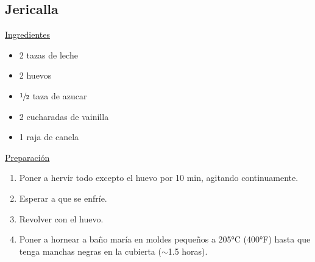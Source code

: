 \subsection{Jericalla}
\underline{Ingredientes}
\begin{itemize}
\item 2 tazas de leche
\item 2 huevos 
\item $\sfrac{1}{2}$ taza de azucar
\item 2 cucharadas de vainilla
\item 1 raja de canela
\end{itemize}

\underline{Preparaci\'on}
\begin{enumerate}
\item Poner a hervir todo excepto el huevo por 10 min, agitando continuamente.
\item Esperar a que se enfr\'ie.
\item Revolver con el huevo.
\item Poner a hornear a ba\~no mar\'ia en moldes peque\~nos a 205°C (400°F) hasta que tenga manchas negras en la cubierta ($\sim$1.5 horas). 
\end{enumerate}
